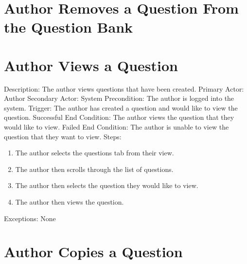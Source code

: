     
    
    \section{Author Removes a Question From the Question Bank}
    
    
    
    \section{Author Views a Question}
        Description: The author views questions that have been created. \newline
        Primary Actor: Author \newline
        Secondary Actor: System \newline
        Precondition: The author is logged into the system. \newline
        Trigger: The author has created a question and would like to view the question. \newline
        Successful End Condition: The author views the question that they would like to view. \newline
        Failed End Condition: The author is unable to view the question that they want to view. \newline
        \newline
        Steps:
        \begin{enumerate}
            \item{The author selects the questions tab from their view.}
            \item{The author then scrolls through the list of questions.}
            \item{The author then selects the question they would like to view.}
            \item{The author then views the question.}
        \end{enumerate}
        Exceptions: None
    
    
    \section{Author Copies a Question} 


